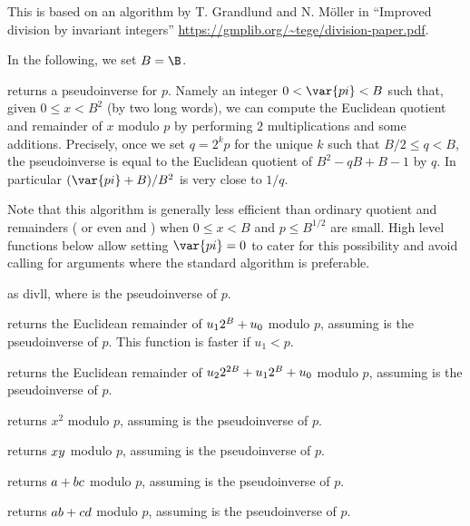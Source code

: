 
This is based on an algorithm by T. Grandlund and N. M\"{o}ller in
``Improved division by invariant integers''
\url{https://gmplib.org/~tege/division-paper.pdf}.

In the following, we set $B=\B$.

 returns a pseudoinverse  for $p$.
Namely an integer $0 < \var{pi} < B$ such that, given $0 \leq x < B^2$ (by
two long words), we can compute the Euclidean quotient and remainder of $x$
modulo $p$ by performing $2$ multiplications and some additions. Precisely,
once we set $q = 2^k p$ for the unique $k$ such that $B/2 \leq q < B$, the
pseudoinverse  is equal to the Euclidean quotient of $B^2 - qB + B-1$
by $q$. In particular $(\var{pi} + B) / B^2$ is very close to $1/q$.

Note that this algorithm is generally less efficient than ordinary quotient
and remainders ( or even \kbd{/} and \kbd{\%}) when $0\leq x < B$
and $p \leq B^{1/2}$ are small. High level functions below allow setting
$\var{pi} = 0$ to cater for this possibility and avoid calling
 for arguments where the standard algorithm is preferable.

as divll, where  is the pseudoinverse of $p$.

 returns
the Euclidean remainder of $u_1\*2^B+u_0$ modulo $p$, assuming  is the
pseudoinverse of $p$.  This function is faster if $u_1 < p$.

returns the Euclidean remainder of $u_2\*2^{2\*B}+u_1\*2^{B}+u_0$ modulo $p$,
assuming  is the pseudoinverse of $p$.

 returns $x^2$ modulo $p$,
assuming  is the pseudoinverse of $p$.

 returns $x\*y$
modulo $p$, assuming  is the pseudoinverse of $p$.

returns $a+b\*c$ modulo $p$, assuming  is the pseudoinverse of $p$.

returns $a\*b+c\*d$ modulo $p$, assuming  is the pseudoinverse of $p$.

